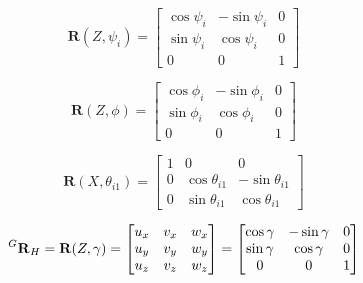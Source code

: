 \documentclass[titlepage, letterpaper, fleqn]{article}
\let\bs\mathbf
\begin{document}
\begin{equation}
    \label{eq:rot_Z_psi}
    \bs{R}(Z,\psi_i) =
    \begin{bmatrix}
        \cos\psi_i & -\sin\psi_i & 0 \\
        \sin\psi_i & \cos\psi_i & 0 \\
        0 & 0 & 1
    \end{bmatrix}
\end{equation}

\begin{equation}
    \label{eq:rot_Z_phi}
    \bs{R}(Z,\phi) =
    \begin{bmatrix}
        \cos\phi_i & -\sin\phi_i & 0 \\
        \sin\phi_i & \cos\phi_i & 0 \\
        0 & 0 & 1
    \end{bmatrix}
\end{equation}

\begin{equation}
    \label{eq:rot_X_theta}
    \bs{R}(X,\theta_{i1}) =
    \begin{bmatrix}
        1 & 0 & 0 \\
        0 & \cos\theta_{i1} & -\sin\theta_{i1} \\
        0 & \sin\theta_{i1} & \cos\theta_{i1}
    \end{bmatrix}
\end{equation}

\begin{equation}
    \label{eq:rot_H_global}
    \prescript{G}{}{\bs{R}}_H =
    \bs{R}(Z,\gamma) =
    \begin{bmatrix}
    u_x & v_x & w_x \\
    u_y & v_y & w_y \\
    u_z & v_z & w_z
    \end{bmatrix}
    =
    \begin{bmatrix}
    \cos\gamma & -\sin\gamma & 0 \\
    \sin\gamma & \cos\gamma & 0 \\
    0 & 0 & 1
    \end{bmatrix}
\end{equation}


\end{document}
